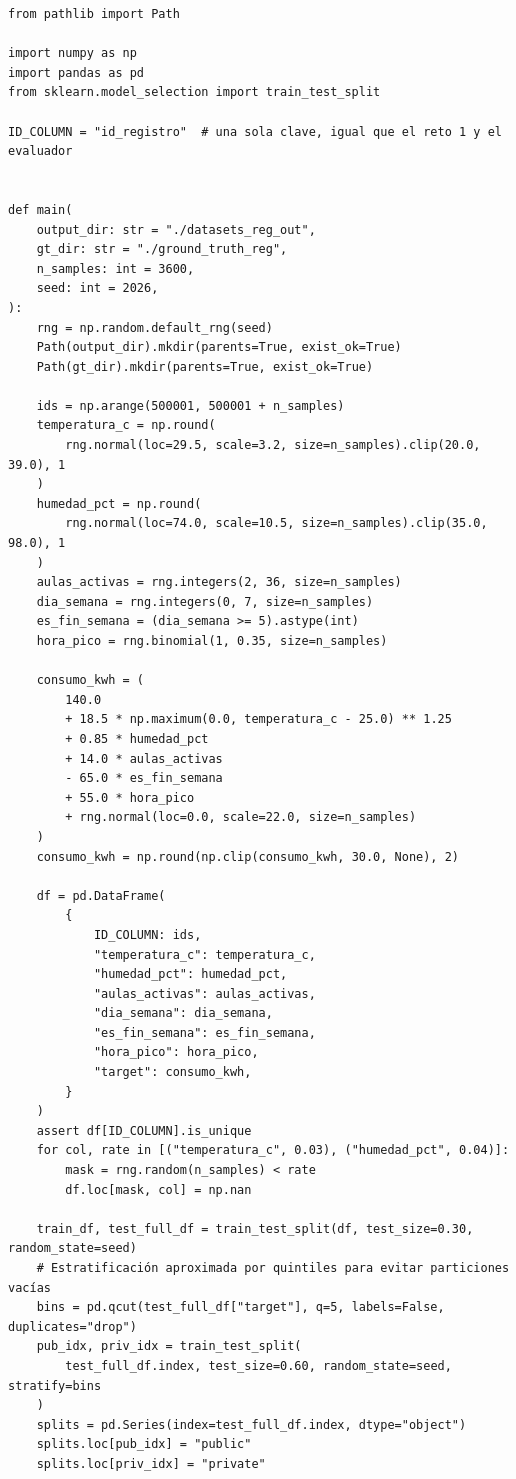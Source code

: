 \documentclass[11pt,a4paper]{article}
\begin{document}
\begin{lstlisting}
from pathlib import Path

import numpy as np
import pandas as pd
from sklearn.model_selection import train_test_split

ID_COLUMN = "id_registro"  # una sola clave, igual que el reto 1 y el evaluador


def main(
    output_dir: str = "./datasets_reg_out",
    gt_dir: str = "./ground_truth_reg",
    n_samples: int = 3600,
    seed: int = 2026,
):
    rng = np.random.default_rng(seed)
    Path(output_dir).mkdir(parents=True, exist_ok=True)
    Path(gt_dir).mkdir(parents=True, exist_ok=True)

    ids = np.arange(500001, 500001 + n_samples)
    temperatura_c = np.round(
        rng.normal(loc=29.5, scale=3.2, size=n_samples).clip(20.0, 39.0), 1
    )
    humedad_pct = np.round(
        rng.normal(loc=74.0, scale=10.5, size=n_samples).clip(35.0, 98.0), 1
    )
    aulas_activas = rng.integers(2, 36, size=n_samples)
    dia_semana = rng.integers(0, 7, size=n_samples)
    es_fin_semana = (dia_semana >= 5).astype(int)
    hora_pico = rng.binomial(1, 0.35, size=n_samples)

    consumo_kwh = (
        140.0
        + 18.5 * np.maximum(0.0, temperatura_c - 25.0) ** 1.25
        + 0.85 * humedad_pct
        + 14.0 * aulas_activas
        - 65.0 * es_fin_semana
        + 55.0 * hora_pico
        + rng.normal(loc=0.0, scale=22.0, size=n_samples)
    )
    consumo_kwh = np.round(np.clip(consumo_kwh, 30.0, None), 2)

    df = pd.DataFrame(
        {
            ID_COLUMN: ids,
            "temperatura_c": temperatura_c,
            "humedad_pct": humedad_pct,
            "aulas_activas": aulas_activas,
            "dia_semana": dia_semana,
            "es_fin_semana": es_fin_semana,
            "hora_pico": hora_pico,
            "target": consumo_kwh,
        }
    )
    assert df[ID_COLUMN].is_unique
    for col, rate in [("temperatura_c", 0.03), ("humedad_pct", 0.04)]:
        mask = rng.random(n_samples) < rate
        df.loc[mask, col] = np.nan

    train_df, test_full_df = train_test_split(df, test_size=0.30, random_state=seed)
    # Estratificación aproximada por quintiles para evitar particiones vacías
    bins = pd.qcut(test_full_df["target"], q=5, labels=False, duplicates="drop")
    pub_idx, priv_idx = train_test_split(
        test_full_df.index, test_size=0.60, random_state=seed, stratify=bins
    )
    splits = pd.Series(index=test_full_df.index, dtype="object")
    splits.loc[pub_idx] = "public"
    splits.loc[priv_idx] = "private"


\end{lstlisting}
\end{document}
